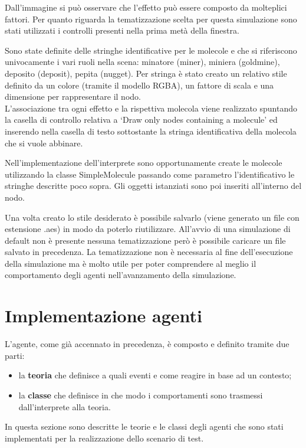Dall'immagine si può osservare che l'effetto può essere composto da molteplici fattori.
Per quanto riguarda la tematizzazione scelta per questa simulazione sono stati utilizzati i controlli presenti nella prima metà della finestra.
\newline

Sono state definite delle stringhe identificative per le molecole e che si riferiscono univocamente i vari ruoli nella scena: minatore (miner), miniera (goldmine), deposito (deposit), pepita (nugget).
Per stringa è stato creato un relativo stile definito da un colore (tramite il modello RGBA), un fattore di scala e una dimensione per rappresentare il nodo.
\\
L'associazione tra ogni effetto e la rispettiva molecola viene realizzato spuntando la casella di controllo relativa a `Draw only nodes containing a molecule' ed inserendo nella casella di testo sottostante la stringa identificativa della molecola che si vuole abbinare.
\newline

Nell'implementazione dell'interprete sono opportunamente create le molecole utilizzando la classe SimpleMolecule passando come parametro l'identificativo le stringhe descritte poco sopra. Gli oggetti istanziati sono poi inseriti all'interno del nodo.

Una volta creato lo stile desiderato è possibile salvarlo (viene generato un file con estensione .aes) in modo da poterlo riutilizzare.
All'avvio di una simulazione di default non è presente nessuna tematizzazione però è possibile caricare un file salvato in precedenza.
La tematizzazione non è necessaria al fine dell'esecuzione della simulazione ma è molto utile per poter comprendere al meglio il comportamento degli agenti nell'avanzamento della simulazione.


\section{Implementazione agenti}
L'agente, come già accennato in precedenza, è composto e definito tramite due parti:
\begin{itemize}
\item la \textbf{teoria} che definisce a quali eventi e come reagire in base ad un contesto;
\item la \textbf{classe} che definisce in che modo i comportamenti sono trasmessi dall'interprete alla teoria.
\end{itemize}
In questa sezione sono descritte le teorie e le classi degli agenti che sono stati implementati per la realizzazione dello scenario di test.

